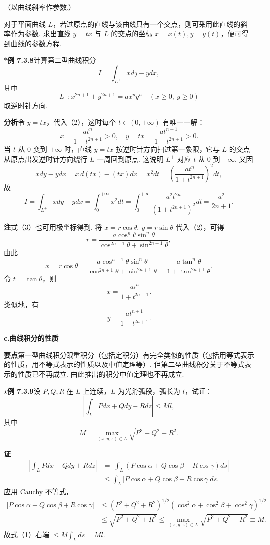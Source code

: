 \documentclass[UTF8,12pt,a4paper,fontset=fandol]{ctexart}
\begin{document}
（以曲线斜率作参数.）

对于平面曲线 $L$，若过原点的直线与该曲线只有一个交点，则可采用此直线的斜率作为参数. 求出直线 $y=tx$ 与 $L$ 的交点的坐标 $x=x(t),y=y(t)$，便可得到曲线的参数方程.

\noindent\textbf{$*$例 7.3.8}\quad 计算第二型曲线积分
\[
I=\int_{L^+}xdy-ydx, \tag{1}
\]
其中
\[
L^+:x^{2n+1}+y^{2n+1}=ax^ny^n\quad(x\ge0,\ y\ge0) \tag{2}
\]
取逆时针方向.

\noindent\textbf{分析}\quad 令 $y=tx$，代入（2），这时每个 $t\in(0,+\infty)$ 有唯一一解：
\[
x=\frac{at^n}{1+t^{2n+1}}>0,\quad
y=tx=\frac{at^{n+1}}{1+t^{2n+1}}>0. \tag{3}
\]
当 $t$ 从 $0$ 变到 $+\infty$ 时，直线 $y=tx$ 按逆时针方向扫过第一象限，它与 $L$ 的交点从原点出发逆时针方向绕行 $L$ 一周回到原点. 这说明 $L^+$ 对应 $t$ 从 $0$ 到 $+\infty$. 又因
\[
xdy-ydx=x\,d(tx)-(tx)dx=x^2dt=
\left(\frac{at^n}{1+t^{2n+1}}\right)^2dt,
\]
故
\[
I=\int_{L^+}xdy-ydx=\int_0^{+\infty}x^2dt
=\int_0^{+\infty}\frac{a^2t^{2n}}{(1+t^{2n+1})^2}dt
=\frac{a^2}{2n+1}.
\]

\noindent\textbf{注}\quad 式（3）也可用极坐标得到. 将 $x=r\cos\theta,\ y=r\sin\theta$ 代入（2），可得
\[
r=\frac{a\cos^n\theta\sin^n\theta}{\cos^{2n+1}\theta+\sin^{2n+1}\theta},
\]
由此
\[
x=r\cos\theta=
\frac{a\cos^{n+1}\theta\sin^n\theta}{\cos^{2n+1}\theta+\sin^{2n+1}\theta}
=\frac{a\tan^n\theta}{1+\tan^{2n+1}\theta}.
\]
令 $t=\tan\theta$，则
\[
x=\frac{at^n}{1+t^{2n+1}}.
\]
类似地，有
\[
y=\frac{at^{n+1}}{1+t^{2n+1}}.
\]

\noindent\textbf{c.\quad 曲线积分的性质}

\noindent\textbf{要点}\quad 第一型曲线积分跟重积分（包括定积分）有完全类似的性质（包括用等式表示的性质，用不等式表示的性质以及中值定理等）. 但第二型曲线积分关于不等式表示的性质已不再成立. 由此推出的积分中值定理也不再成立.

\noindent\textbf{$\star$例 7.3.9}\quad 设 $P,Q,R$ 在 $L$ 上连续，$L$ 为光滑弧段，弧长为 $l$，试证：
\[
\left|\int_LPdx+Qdy+Rdz\right|\le Ml,
\]
其中
\[
M=\max_{(x,y,z)\in L}\sqrt{P^2+Q^2+R^2}.
\]

\noindent\textbf{证}\quad
\begin{equation}
\begin{aligned}
\left|\int_LPdx+Qdy+Rdz\right|
&=\left|\int_L(P\cos\alpha+Q\cos\beta+R\cos\gamma)ds\right|\\
&\le\int_L|P\cos\alpha+Q\cos\beta+R\cos\gamma|ds.
\end{aligned}
\tag{1}
\end{equation}
应用 Cauchy 不等式，
\[
\begin{aligned}
|P\cos\alpha+Q\cos\beta+R\cos\gamma|
&\le(P^2+Q^2+R^2)^{1/2}
(\cos^2\alpha+\cos^2\beta+\cos^2\gamma)^{1/2}\\
&\le\sqrt{P^2+Q^2+R^2}
\le\max_{(x,y,z)\in L}\sqrt{P^2+Q^2+R^2}\equiv M.
\end{aligned}
\]
故式（1）右端 $\le M\int_Lds=Ml$.
\end{document}
